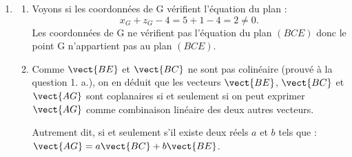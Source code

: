 \begin{enumerate}
\begin{enumerate}
\item Par propriété, on en déduit qu'une équation cartésienne du plan $(BCE)$ est de la forme $3\times x+0\times y+3\times z+d=0$.

B étant un point du plan $(BCE)$, ses coordonnées doivent vérifier l'équation du plan.
\[
B\in (BCE)\Longleftrightarrow 3\times 1+3\times 3+d=0
\Longleftrightarrow 12+d=0
\Longleftrightarrow d=-12.
\]
Une équation cartésienne du plan est donc $3x+3z-12=0$.

En divisant cette équation par 3 (qui est non nul), on obtient une équation équivalente, donc une équation du plan $(BCE)$ est bien : $x+z-4=0$.
\end{enumerate}

\item \begin{enumerate}
\item Voyons si les coordonnées de G vérifient l'équation du plan :
\[
x_G+z_G-4=5+1-4=2\neq 0.
\]
Les coordonnées de G ne vérifient pas l'équation du plan $(BCE)$ donc le point G n'appartient pas au plan $(BCE)$.

\item Comme $\vect{BE}$ et $\vect{BC}$ ne sont pas colinéaire (prouvé à la question 1. a.), on en déduit que les vecteurs $\vect{BE}$, $\vect{BC}$ et $\vect{AG}$ sont coplanaires si et seulement si on peut exprimer $\vect{AG}$ comme combinaison linéaire des deux autres vecteurs.

Autrement dit, si et seulement s'il existe deux réels $a$ et $b$ tels que : $\vect{AG}=a\vect{BC}+b\vect{BE}$.


\end{enumerate}
\end{enumerate}
